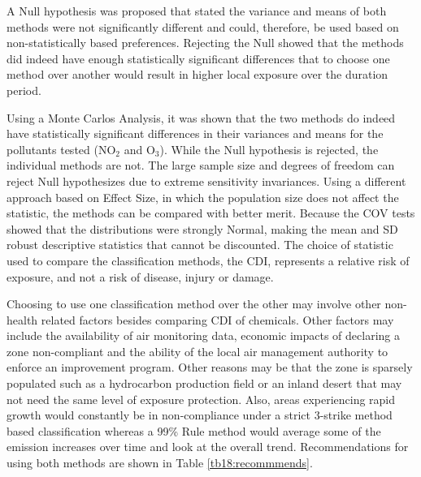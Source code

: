 A Null hypothesis was proposed that stated the variance and means of both methods were not significantly different and could, therefore, be used based on non-statistically based preferences. Rejecting the Null showed that the methods did indeed have enough statistically significant differences that to choose one method over another would result in higher local exposure over the duration period. 

Using a Monte Carlos Analysis, it was shown that the two methods do indeed have statistically significant differences in their variances and means for the pollutants tested (NO$_{2}$ and O$_{3}$). While the Null hypothesis is rejected, the individual methods are not. The large sample size and degrees of freedom can reject Null hypothesizes due to extreme sensitivity invariances. Using a different approach based on Effect Size, in which the population size does not affect the statistic, the methods can be compared with better merit. Because the COV tests showed that the distributions were strongly Normal, making the mean and SD robust descriptive statistics that cannot be discounted. The choice of statistic used to compare the classification methods, the CDI, represents a relative risk of exposure, and not a risk of disease, injury or damage. 

Choosing to use one classification method over the other may involve other non-health related factors besides comparing CDI of chemicals. Other factors may include the availability of air monitoring data, economic impacts of declaring a zone non-compliant and the ability of the local air management authority to enforce an improvement program. Other reasons may be that the zone is sparsely populated such as a hydrocarbon production field or an inland desert that may not need the same level of exposure protection. Also, areas experiencing rapid growth would constantly be in non-compliance under a strict 3-strike method based classification whereas a 99\% Rule method would average some of the emission increases over time and look at the overall trend. Recommendations for using both methods are shown in Table \ref{tb18:recommmends}.

% 
\begin{table}[H]
\centering
\caption{Recommended uses for classification methods.}
\label{tb18:recommmends}
\end{table}


